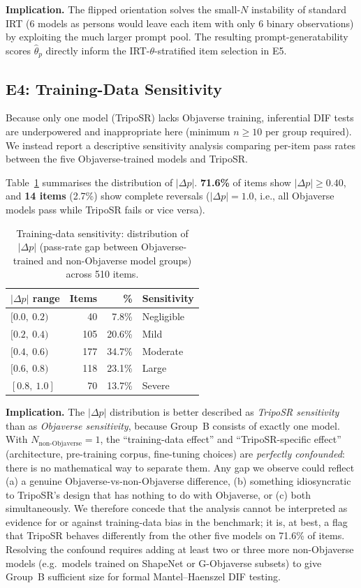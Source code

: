 \documentclass[10pt]{article}
\begin{document}
\textbf{Implication.}
The flipped orientation solves the small-$N$ instability of standard IRT
(6 models as persons would leave each item with only 6 binary observations)
by exploiting the much larger prompt pool.
The resulting prompt-generatability scores $\hat{\theta}_p$ directly inform
the IRT-$\theta$-stratified item selection in E5.

\subsection{E4: Training-Data Sensitivity}
\label{sec:e4}

Because only one model (TripoSR) lacks Objaverse training, inferential DIF
tests are underpowered and inappropriate here (minimum $n\geq10$ per group
required).
We instead report a descriptive sensitivity analysis comparing per-item pass
rates between the five Objaverse-trained models and TripoSR.

Table~\ref{tab:dif} summarises the distribution of $|\Delta p|$.
\textbf{71.6\%} of items show $|\Delta p|\geq0.40$, and \textbf{14 items} (2.7\%)
show complete reversals ($|\Delta p|=1.0$, i.e., all Objaverse models pass
while TripoSR fails or vice versa).

\begin{table}[h]
\centering
\small
\caption{Training-data sensitivity: distribution of $|\Delta p|$ (pass-rate gap between
Objaverse-trained and non-Objaverse model groups) across 510 items.}
\label{tab:dif}
\begin{tabular}{lrrl}
\toprule
$|\Delta p|$ range & Items & \% & Sensitivity \\
\midrule
$[0.0,\ 0.2)$  &  40 &  7.8\% & Negligible \\
$[0.2,\ 0.4)$  & 105 & 20.6\% & Mild \\
$[0.4,\ 0.6)$  & 177 & 34.7\% & Moderate \\
$[0.6,\ 0.8)$  & 118 & 23.1\% & Large \\
$[0.8,\ 1.0]$  &  70 & 13.7\% & Severe \\
\bottomrule
\end{tabular}
\end{table}

\textbf{Implication.}
The $|\Delta p|$ distribution is better described as \emph{TripoSR sensitivity}
than as \emph{Objaverse sensitivity}, because Group~B consists of exactly one
model.
With $N_\text{non-Objaverse}=1$, the ``training-data effect'' and
``TripoSR-specific effect'' (architecture, pre-training corpus, fine-tuning
choices) are \emph{perfectly confounded}: there is no mathematical way to
separate them.
Any gap we observe could reflect (a) a genuine Objaverse-vs-non-Objaverse
difference, (b) something idiosyncratic to TripoSR's design that has nothing
to do with Objaverse, or (c) both simultaneously.
We therefore concede that the analysis cannot be interpreted as evidence for
or against training-data bias in the benchmark; it is, at best, a flag that
TripoSR behaves differently from the other five models on 71.6\% of items.
Resolving the confound requires adding at least two or three more
non-Objaverse models (e.g.\ models trained on ShapeNet or G-Objaverse
subsets) to give Group~B sufficient size for formal Mantel--Haenszel DIF
testing.
\end{document}
